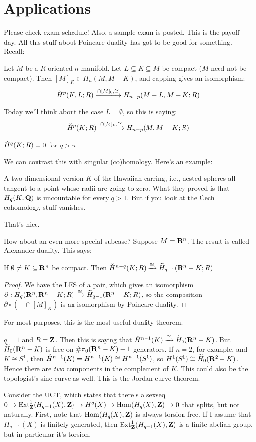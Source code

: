 \section{Applications}
Please check exam schedule! Also, a sample exam is posted. This is the payoff day. All this stuff about Poincare duality has got to be good for something. Recall:
\begin{theorem}
Let $M$ be a $R$-oriented $n$-manifold. Let $L\subseteq K\subseteq M$ be compact ($M$ need not be compact). Then $[M]_K\in H_n(M,M-K)$, and capping gives an isomorphism:
$$\check{H}^p(K,L;R)\xrightarrow{\cap[M]_k,\cong}H_{n-p}(M-L,M-K;R)$$
\end{theorem}
Today we'll think about the case $L=\emptyset$, so this is saying:
$$\check{H}^p(K;R)\xrightarrow{\cap[M]_k,\cong}H_{n-p}(M,M-K;R)$$
\begin{corollary}
$\check{H}^q(K;R)=0$ for $q>n$.
\end{corollary}
We can contrast this with singular (co)homology. Here's an example:
\begin{example}
A two-dimensional version $K$ of the Hawaiian earring, i.e., nested spheres all tangent to a point whose radii are going to zero. What they proved is that $H_q(K;\mathbf Q)$ is uncountable for every $q>1$. But if you look at the \v{C}ech cohomology, stuff vanishes.
\end{example}
That's nice.

How about an even more special subcase? Suppose $M=\mathbf R^n$. The result is called Alexander duality. This says:
\begin{theorem}
If $\emptyset\neq K\subseteq \mathbf R^n$ be compact. Then $\check{H}^{n-q}(K;R)\xrightarrow{\cong}\widetilde{H}_{q-1}(\mathbf R^n-K;R)$
\end{theorem}
\begin{proof}
We have the LES of a pair, which gives an isomorphism $\partial:H_q(\mathbf R^n,\mathbf R^n-K;R)\xrightarrow{\cong}\widetilde{H}_{q-1}(\mathbf R^n-K;R)$, so the composition $\partial\circ(-\cap[M]_K)$ is an isomorphism by Poincare duality.
\end{proof}
For most purposes, this is the most useful duality theorem.
\begin{example}
$q=1$ and $R=\mathbf Z$. Then this is saying that $\check{H}^{n-1}(K)\xrightarrow{\cong}\widetilde{H}_0(\mathbf R^n-K)$. But $\widetilde{H}_0(\mathbf R^n-K)$ is free on $\#\pi_0(\mathbf R^n-K)-1$ generators. If $n=2$, for example, and $K\cong S^1$, then $\check{H}^{n-1}(K)=H^{n-1}(K)\cong H^{n-1}(S^1)$, so $H^1(S^1)\cong \widetilde{H}_0(\mathbf R^2-K)$. Hence there are \emph{two} components in the complement of $K$. This could also be the topologist's sine curve as well. This is the Jordan curve theorem.
\end{example}
Consider the UCT, which states that there's a sexseq $0\to\operatorname{Ext}^1_\mathbf Z(H_{q-1}(X),\mathbf Z)\to H^q(X)\to\operatorname{Hom}(H_q(X),\mathbf Z)\to 0$ that splits, but not naturally. First, note that $\operatorname{Hom}(H_q(X),\mathbf Z)$ is always torsion-free. If I assume that $H_{q-1}(X)$ is finitely generated, then $\operatorname{Ext}^1_\mathbf Z(H_{q-1}(X),\mathbf Z)$ is a finite abelian group, but in particular it's torsion.

